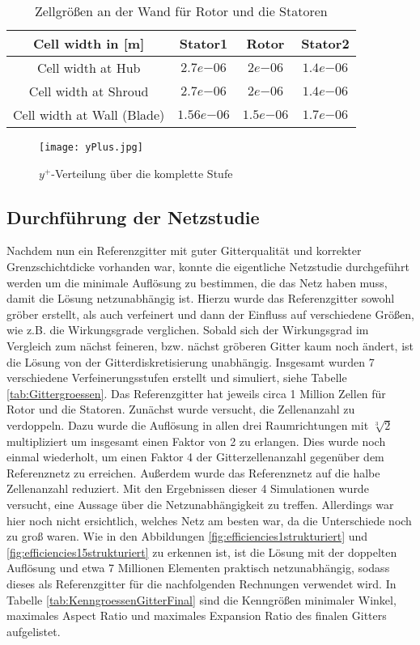 \begin{table}[H]
\centering
\begin{tabular}[t]{cccc}
\toprule
 Cell width in [m] & Stator1 & Rotor & Stator2  \\
\midrule
Cell width at Hub & $2.7e{-06}$ & $2e{-06}$ & $1.4e{-06}$\\
Cell width at Shroud & $2.7e{-06}$ & $2e{-06}$ & $1.4e{-06}$ \\
Cell width at Wall (Blade) & $1.56e{-06}$ & $1.5e{-06}$ & $1.7e{-06}$ \\
\bottomrule
\end{tabular}
\caption{Zellgrößen an der Wand für Rotor und die Statoren} \label{cellWidths}
\end{table}

\begin{figure}[H]
	\centering
    
	\texttt{[image: yPlus.jpg]}
	\caption{$y^+$-Verteilung über die komplette Stufe} \label{imgYplusWerte}
\end{figure}

\subsection{Durchführung der Netzstudie}

Nachdem nun ein Referenzgitter mit guter Gitterqualität und korrekter Grenzschichtdicke vorhanden war, konnte die eigentliche Netzstudie durchgeführt werden um die minimale Auflösung zu bestimmen, die das Netz haben muss, damit die Lösung netzunabhängig ist. Hierzu wurde das Referenzgitter sowohl gröber erstellt, als auch verfeinert und dann der Einfluss auf verschiedene Größen, wie z.B. die Wirkungsgrade verglichen. Sobald sich der Wirkungsgrad im Vergleich zum nächst feineren, bzw. nächst gröberen Gitter kaum noch ändert, ist die Lösung von der Gitterdiskretisierung unabhängig. 
Insgesamt wurden 7 verschiedene Verfeinerungsstufen erstellt und simuliert, siehe Tabelle \ref{tab:Gittergroessen}. Das Referenzgitter hat jeweils circa 1 Million Zellen für Rotor und die Statoren. Zunächst wurde versucht, die Zellenanzahl zu verdoppeln. Dazu wurde die Auflösung in allen drei Raumrichtungen mit $\sqrt[3]{2}$ multipliziert um insgesamt einen Faktor von 2 zu erlangen. Dies wurde noch einmal wiederholt, um einen Faktor 4 der Gitterzellenanzahl gegenüber dem Referenznetz zu erreichen. Außerdem wurde das Referenznetz auf die halbe Zellenanzahl reduziert. Mit den Ergebnissen dieser 4 Simulationen wurde versucht, eine Aussage über die Netzunabhängigkeit zu treffen. Allerdings war hier noch nicht  ersichtlich, welches Netz am besten war, da die Unterschiede noch zu groß waren. Wie in den Abbildungen \ref{fig:efficiencies1strukturiert} und  \ref{fig:efficiencies15strukturiert} zu erkennen ist, ist die Lösung mit der doppelten Auflösung und etwa 7 Millionen Elementen praktisch netzunabhängig, sodass dieses als Referenzgitter für die nachfolgenden Rechnungen verwendet wird. 
In Tabelle \ref{tab:KenngroessenGitterFinal}  sind die Kenngrößen minimaler Winkel, maximales Aspect Ratio und maximales Expansion Ratio des finalen Gitters aufgelistet.

